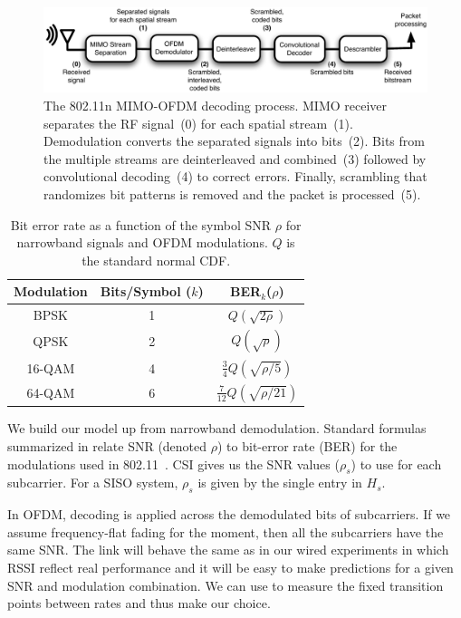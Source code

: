 \begin{figure}[ht!]
\centering
\includegraphics[width=6in]{figures/esnr/mimo_ofdm_decoding_process.pdf}
\caption[The 802.11n MIMO-OFDM decoding process]{\label{fig:ofdm_decoding} The 802.11n MIMO-OFDM decoding process. MIMO receiver separates the RF signal~(0) for each spatial stream~(1). Demodulation converts the separated signals into bits~(2). Bits from the multiple streams are deinterleaved and combined~(3) followed by convolutional decoding~(4) to correct errors. Finally, scrambling that randomizes bit patterns is removed and the packet is processed~(5).}
\end{figure}

\begin{table}
\centering
\begin{tabular}{ccc}
\toprule
Modulation & Bits/Symbol ($k$) & BER$_k$($\rho$) \\
\midrule BPSK & 1 & $Q\left(\sqrt{2\rho}\right)$ \\
QPSK & 2 & $Q\left(\sqrt{\rho}\right)$\\
16-QAM & 4 & $\frac{3}{4}Q\left(\sqrt{\rho/5}\right)$\\
64-QAM & 6 & $\frac{7}{12}Q\left(\sqrt{\rho/21}\right)$\\
\bottomrule
\end{tabular}
\caption[Bit error rate as a function of the symbol SNR for OFDM modulations]{\label{tab:ber_snr}Bit error rate as a function of the symbol SNR $\rho$ for narrowband signals and OFDM modulations. $Q$ is the standard normal CDF\@.}
\end{table}

We build our model up from narrowband demodulation. 
Standard formulas summarized in  relate SNR (denoted $\rho$) to bit-error rate (BER) for the modulations used in 802.11~\cite{Goldsmith}. CSI gives us the SNR values ($\rho_s$) to use for each subcarrier. For a SISO system, $\rho_s$ is given by the single entry in $H_s$.

In OFDM, decoding is applied across the demodulated bits of subcarriers. If we assume frequency-flat fading for the moment, then all the subcarriers have the same SNR\@. The link will behave the same as in our wired experiments in which RSSI reflect real performance and it will be easy to make predictions for a given SNR and modulation combination. We can use  to measure the fixed transition points between rates and thus make our choice.

